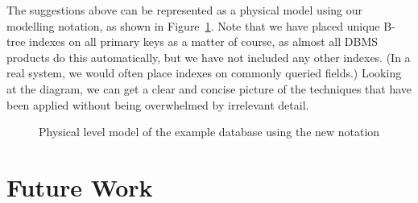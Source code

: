 \documentclass{CRPITStyle}
\begin{document}
The suggestions above can be represented as a physical model using our
modelling notation, as shown in Figure~\ref{fig-physical-model}. Note
that we have placed unique B-tree indexes on all primary keys as a
matter of course, as almost all DBMS products do this automatically, but
we have not included any other indexes. (In a real system, we would
often place indexes on commonly queried fields.) Looking at the diagram,
we can get a clear and concise picture of the techniques that have been
applied without being overwhelmed by irrelevant detail.


\begin{figure}[htb]
	\caption{Physical level model of the example database using the new notation}
	\label{fig-physical-model}
\end{figure}


\section{Future Work}
\label{sec-future}
\end{document}
